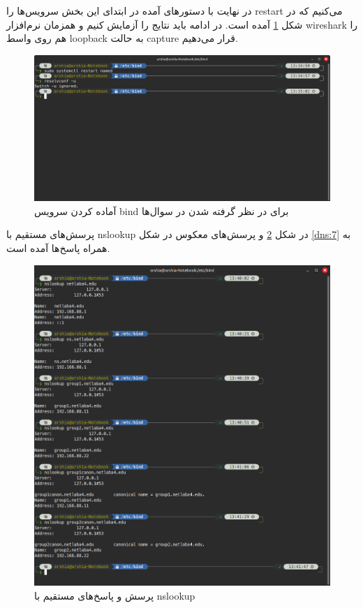 \documentclass[12pt]{article}
\begin{document}
	در نهایت با دستور‌های آمده در ابتدای این بخش سرویس‌ها را restart می‌کنیم که در شکل
	 \ref{dns:5}
	 آمده است. در ادامه باید نتایج را آزمایش ‌کنیم و همزمان نرم‌افزار wireshark را هم روی واسط loopback به حالت capture قرار می‌دهیم. 
	\begin{figure}[H]
		\centering
		\includegraphics[width=\textwidth]{resources/7.png}
		\caption{آماده کردن سرویس bind برای در نظر گرفته شدن در سوال‌ها}
		\label{dns:5}
	\end{figure}
	پرسش‌های مستقیم با nslookup در شکل \ref{dns:6} و پرسش‌های معکوس در شکل \ref{dns:7} به همراه پاسخ‌ها آمده است.
	\begin{figure}[H]
		\centering
		\includegraphics[width=\textwidth]{resources/8.png}
		\caption{پرسش و پاسخ‌های مستقیم با nslookup}
		\label{dns:6}
	\end{figure}
\end{document}
